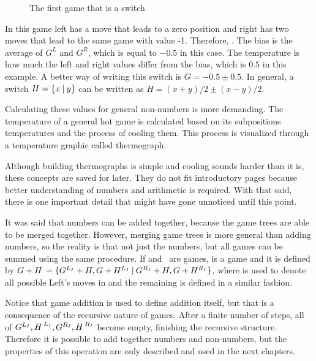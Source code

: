 \begin{figure} [!ht]
	\begin{center}
	\end{center}
	\caption{The first game that is a switch}
\end{figure}

In this game left has a move that leads to a zero position and right has two moves that lead to the same game with value -1. Therefore, . The bias is the average of $G^L$ and $G^R$, which is equal to $-0.5$ in this case. The temperature is how much the left and right values differ from the bias, which is $0.5$ in this example. A better way of writing this switch is $G = -0.5 \pm 0.5$. In general, a switch $H = \mbox{$\{x\:|\:y\}$}$ can be written as $H = (x+y)/2 \pm (x-y)/2$. 

Calculating these values for general non-numbers is more demanding. The temperature of a general hot game is calculated based on its subpositions temperatures and the process of cooling them. This process is visualized through a temperature graphic called thermograph.

Although building thermographs is simple and cooling sounds harder than it is, these concepts are saved for later. They do not fit introductory pages because better understanding of numbers and arithmetic is required. With that said, there is one important detail that might have gone unnoticed until this point.

It was said that numbers can be added together, because the game trees are able to be merged together. However, merging game trees is more general than adding numbers, so the reality is that not just the numbers, but all games can be summed using the same procedure. If \Gm{} and \Hm$\,$ are games, \Gm{ + \Hm} is a game and it is defined by $\mbox{$G + \mbox{$H\,$} = \mbox{$\{G^{L_I}+H, G+H^{L_I}\:|\:G^{R_I}+H, G+H^{R_I}\}$}$}$, where  is used to denote all possible Left's moves in \Gm{} and the remaining is defined in a similar fashion.

Notice that game addition is used to define addition itself, but that is a consequence of the recursive nature of games. After a finite number of steps, all of $\mbox{$G^{L_I}$}, \mbox{$H\,$}^{L_I}, \mbox{$G^{R_I}$}, \mbox{$H\,$}^{R_I}$ become empty, finishing the recursive structure. Therefore it is possible to add together numbers and non-numbers, but the properties of this operation are only described and used in the next chapters.







